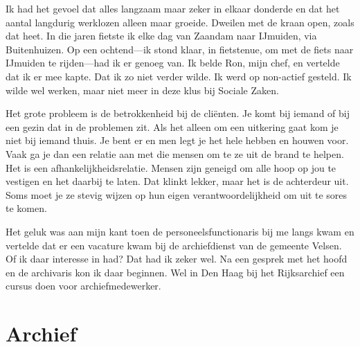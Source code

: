 \documentclass[10pt,twoside, openright]{memoir}
\begin{document}
Ik had het gevoel dat alles langzaam maar zeker in elkaar donderde en dat het aantal langdurig werklozen alleen maar groeide. Dweilen met de kraan open, zoals dat heet. In die jaren fietste ik elke dag van Zaandam naar IJmuiden, via Buitenhuizen. Op een ochtend---ik stond klaar, in fietstenue, om met de fiets naar IJmuiden te rijden---had ik er genoeg van. Ik belde Ron, mijn chef, en vertelde dat ik er mee kapte. Dat ik zo niet verder wilde. Ik werd op non-actief gesteld. Ik wilde wel werken, maar niet meer in deze klus bij Sociale Zaken.

Het grote probleem is de betrokkenheid bij de cliënten. Je komt bij iemand of bij een gezin dat in de problemen zit. Als het alleen om een uitkering gaat kom je niet bij iemand thuis. Je bent er en men legt je het hele hebben en houwen voor. Vaak ga je dan een relatie aan met die mensen om te ze uit de brand te helpen. Het is een afhankelijkheidsrelatie. Mensen zijn geneigd om alle hoop op jou te vestigen en het daarbij te laten. Dat klinkt lekker, maar het is de achterdeur uit. Soms moet je ze stevig wijzen op hun eigen verantwoordelijkheid om uit te sores te komen. 

Het geluk was aan mijn kant toen de personeelsfunctionaris bij me langs kwam en vertelde dat er een vacature kwam bij de archiefdienst van de gemeente Velsen. Of ik daar interesse in had? Dat had ik zeker wel. Na een gesprek met het hoofd en de archivaris kon ik daar beginnen. Wel in Den Haag bij het Rijksarchief een cursus doen voor archiefmedewerker. 

\chapter{Archief} %
\label{cha:archief}
\end{document}
